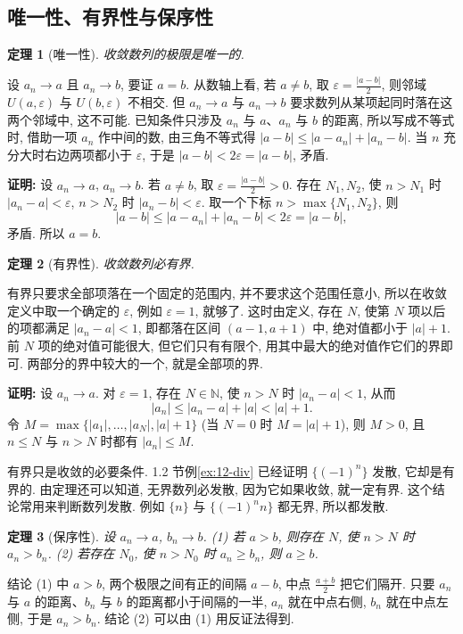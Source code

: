 \documentclass[UTF8,openany]{ctexbook}
\theoremstyle{chinesetextbook}
\newtheorem{theorem}{定理}[section]
\newenvironment{cnproof}{\par\indent\textbf{证明:} \ignorespaces}{\par}
\begin{document}
\subsection{唯一性、有界性与保序性}
\begin{theorem}[唯一性]
收敛数列的极限是唯一的.
\end{theorem}
设 $a_n\to a$ 且 $a_n\to b$, 要证 $a=b$. 从数轴上看, 若 $a\ne b$, 取 $\displaystyle\varepsilon=\frac{|a-b|}2$, 则邻域 $U(a,\varepsilon)$ 与 $U(b,\varepsilon)$ 不相交. 但 $a_n\to a$ 与 $a_n\to b$ 要求数列从某项起同时落在这两个邻域中, 这不可能. 已知条件只涉及 $a_n$ 与 $a$、$a_n$ 与 $b$ 的距离, 所以写成不等式时, 借助一项 $a_n$ 作中间的数, 由三角不等式得 $|a-b|\le|a-a_n|+|a_n-b|$. 当 $n$ 充分大时右边两项都小于 $\varepsilon$, 于是 $|a-b|<2\varepsilon=|a-b|$, 矛盾.
\begin{cnproof}
设 $a_n\to a$, $a_n\to b$. 若 $a\ne b$, 取 $\displaystyle\varepsilon=\frac{|a-b|}2>0$. 存在 $N_1,N_2$, 使 $n>N_1$ 时 $|a_n-a|<\varepsilon$, $n>N_2$ 时 $|a_n-b|<\varepsilon$. 取一个下标 $n>\max\{N_1,N_2\}$, 则
\[
|a-b|\le|a-a_n|+|a_n-b|<2\varepsilon=|a-b|,
\]
矛盾. 所以 $a=b$.
\end{cnproof}
\begin{theorem}[有界性]
收敛数列必有界.
\end{theorem}
有界只要求全部项落在一个固定的范围内, 并不要求这个范围任意小, 所以在收敛定义中取一个确定的 $\varepsilon$, 例如 $\varepsilon=1$, 就够了. 这时由定义, 存在 $N$, 使第 $N$ 项以后的项都满足 $|a_n-a|<1$, 即都落在区间 $(a-1,a+1)$ 中, 绝对值都小于 $|a|+1$. 前 $N$ 项的绝对值可能很大, 但它们只有有限个, 用其中最大的绝对值作它们的界即可. 两部分的界中较大的一个, 就是全部项的界.
\begin{cnproof}
设 $a_n\to a$. 对 $\varepsilon=1$, 存在 $N\in\mathbb N$, 使 $n>N$ 时 $|a_n-a|<1$, 从而
\[
|a_n|\le|a_n-a|+|a|<|a|+1.
\]
令 $M=\max\{|a_1|,\ldots,|a_N|,|a|+1\}$ (当 $N=0$ 时 $M=|a|+1$), 则 $M>0$, 且 $n\le N$ 与 $n>N$ 时都有 $|a_n|\le M$.
\end{cnproof}
有界只是收敛的必要条件. 1.2 节例\ref{ex:12-div} 已经证明 $\{(-1)^n\}$ 发散, 它却是有界的. 由定理还可以知道, 无界数列必发散, 因为它如果收敛, 就一定有界. 这个结论常用来判断数列发散. 例如 $\{n\}$ 与 $\{(-1)^nn\}$ 都无界, 所以都发散.
\begin{theorem}[保序性]
设 $a_n\to a$, $b_n\to b$. \textup{(1)} 若 $a>b$, 则存在 $N$, 使 $n>N$ 时 $a_n>b_n$. \textup{(2)} 若存在 $N_0$, 使 $n>N_0$ 时 $a_n\ge b_n$, 则 $a\ge b$.
\end{theorem}
结论 (1) 中 $a>b$, 两个极限之间有正的间隔 $a-b$, 中点 $\displaystyle\frac{a+b}2$ 把它们隔开. 只要 $a_n$ 与 $a$ 的距离、$b_n$ 与 $b$ 的距离都小于间隔的一半, $a_n$ 就在中点右侧, $b_n$ 就在中点左侧, 于是 $a_n>b_n$. 结论 (2) 可以由 (1) 用反证法得到.
\end{document}
